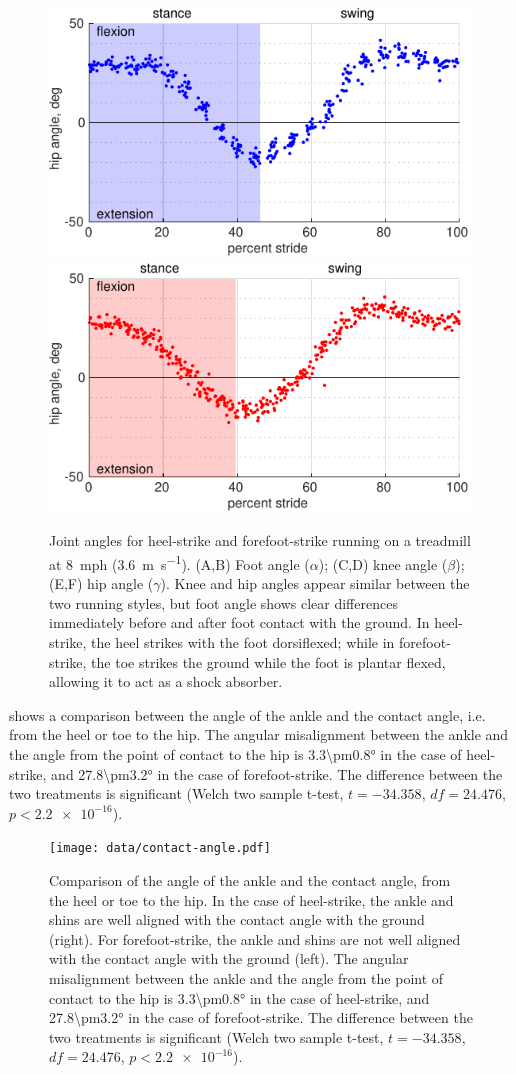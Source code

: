 \begin{figure}
\begin{center}
\includegraphics[width=0.49\columnwidth]{data/heel-hip-angle.pdf}
\includegraphics[width=0.49\columnwidth]{data/toe-hip-angle.pdf}
\end{center}
\caption{Joint angles for heel-strike and forefoot-strike running on a treadmill at \SI{8}{mph} (\SI{3.6}{\meter\per\second}). (A,B) Foot angle ($\alpha$); (C,D) knee angle ($\beta$); (E,F) hip angle ($\gamma$). Knee and hip angles appear similar between the two running styles, but foot angle shows clear differences immediately before and after foot contact with the ground. In heel-strike, the heel strikes with the foot dorsiflexed; while in forefoot-strike, the toe strikes the ground while the foot is plantar flexed, allowing it to act as a shock absorber.}
\label{fig:results:jointangles}
\end{figure}

 shows a comparison between the angle of the ankle and the contact angle, i.e. from the heel or toe to the hip. The angular misalignment between the ankle and the angle from the point of contact to the hip is \ang{3.3\pm0.8} in the case of heel-strike, and \ang{27.8\pm3.2} in the case of forefoot-strike. The difference between the two treatments is significant (Welch two sample t-test, $t=-34.358$, $df=24.476$, $p<\num{2.2e-16}$).
\begin{figure}
\begin{center}
\texttt{[image: data/contact-angle.pdf]}
\end{center}
\caption{Comparison of the angle of the ankle and the contact angle, from the heel or toe to the hip. In the case of heel-strike, the ankle and shins are well aligned with the contact angle with the ground (right). For forefoot-strike, the ankle and shins are not well aligned with the contact angle with the ground (left). The angular misalignment between the ankle and the angle from the point of contact to the hip is \ang{3.3\pm0.8} in the case of heel-strike, and \ang{27.8\pm3.2} in the case of forefoot-strike. The difference between the two treatments is significant (Welch two sample t-test, $t=-34.358$, $df=24.476$, $p<\num{2.2e-16}$).} 
\label{fig:results:contactangles}
\end{figure}
